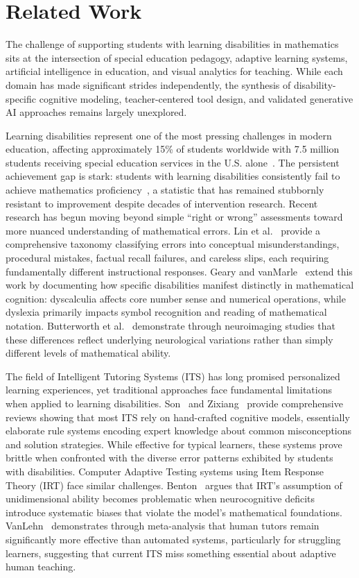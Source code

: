 \documentclass[11pt]{article}
\begin{document}
\section{Related Work}\label{sec:related}

The challenge of supporting students with learning disabilities in mathematics sits at the intersection of special education pedagogy, adaptive learning systems, artificial intelligence in education, and visual analytics for teaching. While each domain has made significant strides independently, the synthesis of disability-specific cognitive modeling, teacher-centered tool design, and validated generative AI approaches remains largely unexplored.

Learning disabilities represent one of the most pressing challenges in modern education, affecting approximately 15\% of students worldwide with 7.5 million students receiving special education services in the U.S. alone~\cite{ref1}. The persistent achievement gap is stark: students with learning disabilities consistently fail to achieve mathematics proficiency~\cite{ref2}, a statistic that has remained stubbornly resistant to improvement despite decades of intervention research. Recent research has begun moving beyond simple ``right or wrong'' assessments toward more nuanced understanding of mathematical errors. Lin et al.~\cite{ref4} provide a comprehensive taxonomy classifying errors into conceptual misunderstandings, procedural mistakes, factual recall failures, and careless slips, each requiring fundamentally different instructional responses. Geary and vanMarle~\cite{ref6} extend this work by documenting how specific disabilities manifest distinctly in mathematical cognition: dyscalculia affects core number sense and numerical operations, while dyslexia primarily impacts symbol recognition and reading of mathematical notation. Butterworth et al.~\cite{ref7} demonstrate through neuroimaging studies that these differences reflect underlying neurological variations rather than simply different levels of mathematical ability.

The field of Intelligent Tutoring Systems (ITS) has long promised personalized learning experiences, yet traditional approaches face fundamental limitations when applied to learning disabilities. Son~\cite{ref9} and Zixiang~\cite{ref10} provide comprehensive reviews showing that most ITS rely on hand-crafted cognitive models, essentially elaborate rule systems encoding expert knowledge about common misconceptions and solution strategies. While effective for typical learners, these systems prove brittle when confronted with the diverse error patterns exhibited by students with disabilities. Computer Adaptive Testing systems using Item Response Theory (IRT) face similar challenges. Benton~\cite{ref11} argues that IRT's assumption of unidimensional ability becomes problematic when neurocognitive deficits introduce systematic biases that violate the model's mathematical foundations. VanLehn~\cite{ref12} demonstrates through meta-analysis that human tutors remain significantly more effective than automated systems, particularly for struggling learners, suggesting that current ITS miss something essential about adaptive human teaching.
\end{document}
